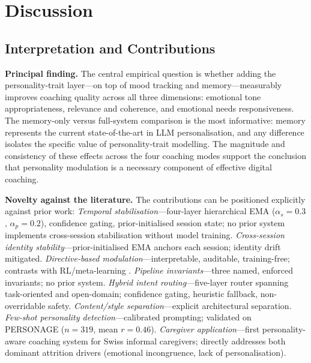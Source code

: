 \documentclass[10pt,a4paper]{report}
\begin{document}
\chapter{Discussion}
\label{ch:discussion}

\section{Interpretation and Contributions}

\textbf{Principal finding.} The central empirical question is whether adding the personality-trait layer---on top of mood tracking and memory---measurably improves coaching quality across all three dimensions: emotional tone appropriateness, relevance and coherence, and emotional needs responsiveness. The memory-only versus full-system comparison is the most informative: memory represents the current state-of-the-art in LLM personalisation, and any difference isolates the specific value of personality-trait modelling. The magnitude and consistency of these effects across the four coaching modes support the conclusion that personality modulation is a necessary component of effective digital coaching.

\textbf{Novelty against the literature.} The contributions can be positioned explicitly against prior work: \emph{Temporal stabilisation}---four-layer hierarchical EMA ($\alpha_s = 0.3$, $\alpha_p = 0.2$), confidence gating, prior-initialised session state; no prior system implements cross-session stabilisation without model training. \emph{Cross-session identity stability}---prior-initialised EMA anchors each session; identity drift \citep{Kovac2024} mitigated. \emph{Directive-based modulation}---interpretable, auditable, training-free; contrasts with RL/meta-learning \citep{denHengst2019, Lin2019, Shea2023}. \emph{Pipeline invariants}---three named, enforced invariants; no prior system. \emph{Hybrid intent routing}---five-layer router spanning task-oriented and open-domain; confidence gating, heuristic fallback, non-overridable safety. \emph{Content/style separation}---explicit architectural separation. \emph{Few-shot personality detection}---calibrated prompting; validated on PERSONAGE ($n = 319$, mean $r = 0.46$). \emph{Caregiver application}---first personality-aware coaching system for Swiss informal caregivers; directly addresses both dominant attrition drivers (emotional incongruence, lack of personalisation).
\end{document}
